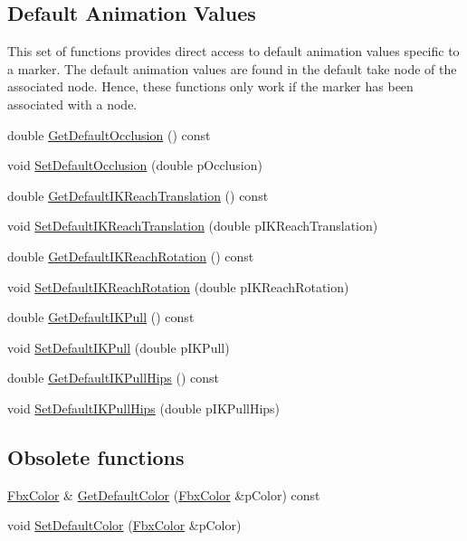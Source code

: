 \subsection*{Default Animation Values}
\label{_amgrpe9597d6700427ce7cec6cfc3e13abb14}%
This set of functions provides direct access to default animation values specific to a marker. The default animation values are found in the default take node of the associated node. Hence, these functions only work if the marker has been associated with a node. \begin{DoxyCompactItemize}
\item 
double \hyperlink{class_fbx_marker_a37de392731e4c44144fb72a7780a3c88}{Get\+Default\+Occlusion} () const
\item 
void \hyperlink{class_fbx_marker_a63161a28a62571c98fd573b95d131de4}{Set\+Default\+Occlusion} (double p\+Occlusion)
\item 
double \hyperlink{class_fbx_marker_a215e206d448ad64aaa4d2ada99077a58}{Get\+Default\+I\+K\+Reach\+Translation} () const
\item 
void \hyperlink{class_fbx_marker_a895e5673867ab2daf2fc5b42efd571f8}{Set\+Default\+I\+K\+Reach\+Translation} (double p\+I\+K\+Reach\+Translation)
\item 
double \hyperlink{class_fbx_marker_a3ac25e2d78c4ed0951259ca9bbbc2ec3}{Get\+Default\+I\+K\+Reach\+Rotation} () const
\item 
void \hyperlink{class_fbx_marker_af4a0f96f399ceb4509d47885aa0f6edf}{Set\+Default\+I\+K\+Reach\+Rotation} (double p\+I\+K\+Reach\+Rotation)
\item 
double \hyperlink{class_fbx_marker_a9645132df40683ea426067e7e759f15d}{Get\+Default\+I\+K\+Pull} () const
\item 
void \hyperlink{class_fbx_marker_abe9b0c67c4b2eb8ec129a477302c9f39}{Set\+Default\+I\+K\+Pull} (double p\+I\+K\+Pull)
\item 
double \hyperlink{class_fbx_marker_a33fe081159e8fbe073fbbd51a7824b94}{Get\+Default\+I\+K\+Pull\+Hips} () const
\item 
void \hyperlink{class_fbx_marker_a21c9ece4ef7df5bdca3e92dd8bff2ddf}{Set\+Default\+I\+K\+Pull\+Hips} (double p\+I\+K\+Pull\+Hips)
\end{DoxyCompactItemize}
\subsection*{Obsolete functions}
\begin{DoxyCompactItemize}
\item 
\hyperlink{class_fbx_color}{Fbx\+Color} \& \hyperlink{class_fbx_marker_a19aa5a522e77d2cbad7f5d4f6b382154}{Get\+Default\+Color} (\hyperlink{class_fbx_color}{Fbx\+Color} \&p\+Color) const
\item 
void \hyperlink{class_fbx_marker_a2e9838e0facbae2d66e64fdbe28d01c0}{Set\+Default\+Color} (\hyperlink{class_fbx_color}{Fbx\+Color} \&p\+Color)
\end{DoxyCompactItemize}
